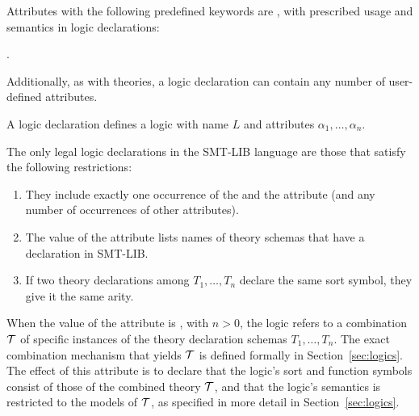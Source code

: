 Attributes with the following predefined keywords are 
, with prescribed usage and semantics 
in logic declarations:
\begin{center}
\qquad
{}\qquad
{}\qquad
{}\qquad
{} .
\end{center}
Additionally, 
as with theories, a logic declaration can contain any number of user-defined attributes.
\bigskip

\cLogics
\bigskip

A logic declaration 
defines a logic with name $L$ and attributes $\alpha_1, \ldots, \alpha_n$.

\begin{constraint}
The only legal logic declarations in the SMT-LIB language are those 
that satisfy the following restrictions:

\begin{enumerate}
\item
They include exactly one occurrence of the  and 
the  attribute
(and any number of occurrences of other attributes).

\item
The value  of the  attribute lists
names of theory schemas that have a declaration in SMT-LIB.

\item
If two theory declarations among $T_1, \ldots, T_n$ declare 
the same sort symbol, they give it the same arity.
\end{enumerate}
\end{constraint}


When the value of the  attribute is ,
with $n > 0$,
the logic refers to a combination $\mathcal{T}$ of specific instances of 
the theory declaration schemas $T_1, \ldots, T_n$.
The exact combination mechanism that yields $\mathcal{T}$ is defined formally in 
Section~\ref{sec:logics}.
The effect of this attribute is to declare that 
the logic's sort and function symbols consist of those of 
the combined theory $\mathcal{T}$,
and that
the logic's semantics is restricted to the models of $\mathcal{T}$,
as specified in more detail in Section~\ref{sec:logics}.


